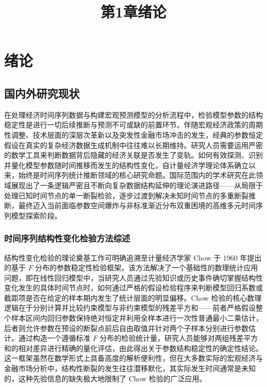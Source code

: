 \documentclass[UTF8,a4paper,12pt]{ctexbook}
\title{第1章\quad 绪论}
\author{}
\date{}
\begin{document}
\maketitle

\chapter{绪论}
\setcounter{section}{1}

\section{国内外研究现状}

在处理经济时间序列数据与构建宏观预测模型的分析流程中，检验模型参数的结构稳定性是进行一切后续推断与预测不可或缺的前置环节。伴随宏观经济政策的周期性调整、技术层面的深层次革新以及突发性金融市场冲击的发生，经典的参数恒定假设在真实的复杂经济数据生成机制中往往难以长期维持。研究人员需要运用严密的数学工具来判断数据背后隐藏的经济关联是否发生了变轨。如何有效探测、识别并量化模型参数随时间推移而发生的结构性变化，自计量经济学理论体系确立以来，始终是时间序列统计推断领域的核心研究命题。国际范围内的学术研究在此领域展现出了一条逻辑严密且不断向复杂数据结构延伸的理论演进路径——从局限于处理已知时间节点的单一断裂检验，逐步过渡到解决未知时间节点的多重断裂推断，最终迈入当前面临参数空间爆炸与非标准渐近分布双重困境的高维多元时间序列模型探索阶段。

\subsection{时间序列结构性变化检验方法综述}

结构性变化检验的理论奠基工作可明确追溯至计量经济学家 Chow 于 1960 年提出的基于 $F$ 分布的参数稳定性检验框架。该方法解决了一个基础性的数理统计应用问题，即在线性回归模型中，当研究人员通过先验知识或历史事件确切掌握结构性变化发生的具体时间节点时，如何通过严格的假设检验程序来判断模型回归系数或截距项是否在给定的样本期内发生了统计层面的明显偏移。Chow 检验的核心数理逻辑在于分别计算并比较约束模型与非约束模型的残差平方和——前者严格假设整个样本区间内回归参数保持绝对恒定并利用全样本进行一次性普通最小二乘估计，后者则允许参数在预设的断裂点前后自由取值并针对两个子样本分别进行参数估计。通过构造一个遵循标准 $F$ 分布的检验统计量，研究人员能够对两组残差平方和的相对差异进行精确的量化评估，由此得出关于参数结构稳定性的确定性结论。这一框架虽然在数学形式上具备高度的解析便利性，但在大多数实际的宏观经济与金融市场分析中，结构性断裂的发生往往潜移默化，其实际发生时间通常是未知的，这种先验信息的缺失极大地限制了 Chow 检验的广泛应用。
\end{document}
